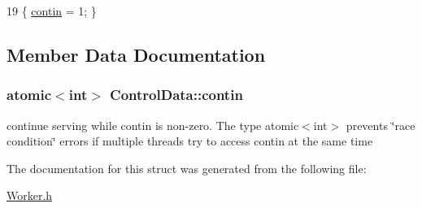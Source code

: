 \begin{DoxyCode}
19 \{ \hyperlink{structControlData_ac8fbf80345423cf5650ae64bfb10dc88}{contin} = 1; \}
\end{DoxyCode}


\subsection{Member Data Documentation}
\hypertarget{structControlData_ac8fbf80345423cf5650ae64bfb10dc88}{}
\subsubsection[{contin}]{\setlength{\rightskip}{0pt plus 5cm}atomic$<$int$>$ Control\+Data\+::contin}\label{structControlData_ac8fbf80345423cf5650ae64bfb10dc88}
continue serving while contin is non-\/zero. The type atomic$<$int$>$ prevents \char`\"{}race condition\char`\"{} errors if multiple threads try to access contin at the same time 

The documentation for this struct was generated from the following file\+:\begin{DoxyCompactItemize}
\item 
\hyperlink{Worker_8h}{Worker.\+h}\end{DoxyCompactItemize}
